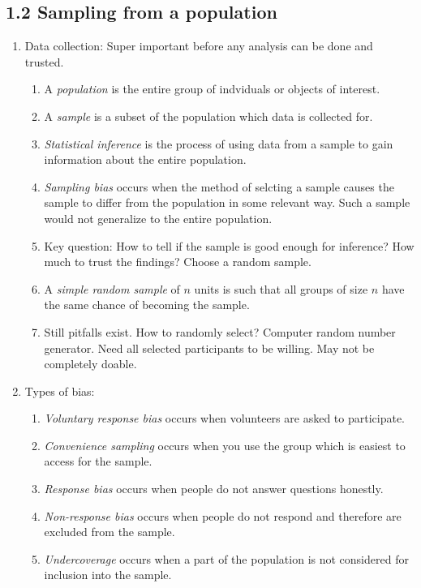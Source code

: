 \documentclass{article}
\begin{document}
\subsection{1.2 Sampling from a population}
\begin{enumerate}

\item Data collection: Super important before any analysis can be done and trusted.
\begin{enumerate}
\item A \emph{population} is the entire group of indviduals or objects of interest.
\item A \emph{sample} is a subset of the population which data is collected for.
\item \emph{Statistical inference} is the process of using data from a sample to gain information about the entire population.
\item \emph{Sampling bias} occurs when the method of selcting a sample causes the sample to differ from the population in some relevant way. Such a sample would not generalize to the entire population.
\item Key question: How to tell if the sample is good enough for inference? How much to trust the findings? Choose a random sample.
\item A \emph{simple random sample} of $n$ units is such that all groups of size $n$ have the same chance of becoming the sample.  
\item Still pitfalls exist. How to randomly select? Computer random number generator. Need all selected participants to be willing. May not be completely doable.
\end{enumerate}

\item Types of bias:
\begin{enumerate}
\item \emph{Voluntary response bias} occurs when volunteers are asked to participate.
\item \emph{Convenience sampling} occurs when you use the group which is easiest to access for the sample. 
\item \emph{Response bias} occurs when people do not answer questions honestly.
\item \emph{Non-response bias} occurs when people do not respond and therefore are excluded from the sample.
\item \emph{Undercoverage} occurs when a part of the population is not considered for inclusion into the sample.
\end{enumerate}

\end{enumerate}
\end{document}
